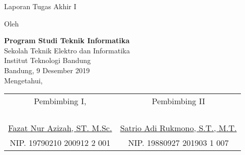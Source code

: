 \clearpage
\pagestyle{empty}

\begin{center}
\smallskip

    \Large \bfseries \MakeUppercase{\thetitle}
    \vfill

    \Large Laporan Tugas Akhir I
    \vfill

    \large Oleh

    \Large \theauthor

    \normalsize
    \textbf{Program Studi Teknik Informatika} \\
    Sekolah Teknik Elektro dan Informatika \\
    Institut Teknologi Bandung \\

    \vfill
    \normalsize \normalfont
    Bandung, 9 Desember 2019 \\
    Mengetahui,

    \vfill
    \setlength{\tabcolsep}{12pt}
    \begin{tabular}{c@{\hskip 0.5in}c}
        Pembimbing I, & Pembimbing II \\
        & \\
        & \\
        & \\
        & \\
        \underline{Fazat Nur Azizah, ST. M.Sc.} & \underline{Satrio Adi Rukmono, S.T., M.T.} \\
        NIP. 19790210 200912 2 001 & NIP. 19880927 201903 1 007 \\
    \end{tabular}

\end{center}
\clearpage
